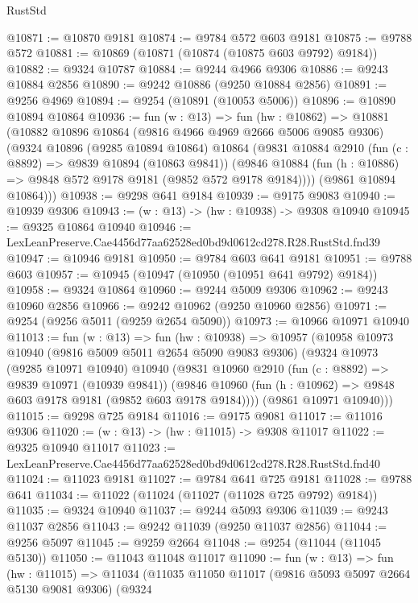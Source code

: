 \begin{lexlean}{RustStd}
\begin{coremodule}
@10871 := @10870 @9181
@10874 := @9784 @572 @603 @9181
@10875 := @9788 @572
@10881 := @10869 (@10871 (@10874 (@10875 @603 @9792) @9184))
@10882 := @9324 @10787
@10884 := @9244 @4966 @9306
@10886 := @9243 @10884 @2856
@10890 := @9242 @10886 (@9250 @10884 @2856)
@10891 := @9256 @4969
@10894 := @9254 (@10891 (@10053 @5006))
@10896 := @10890 @10894 @10864
@10936 := fun (w : @13) =>
  fun (hw : @10862) =>
  @10881
    (@10882
      @10896
      @10864
      (@9816 @4966 @4969 @2666 @5006 @9085 @9306)
      (@9324
        @10896
        (@9285 @10894 @10864)
        @10864
        (@9831
          @10884
          @2910
          (fun (c : @8892) => @9839 @10894 (@10863 @9841))
          (@9846 @10884 (fun (h : @10886) => @9848 @572 @9178 @9181 (@9852 @572 @9178 @9184))))
        (@9861 @10894 @10864)))
@10938 := @9298 @641 @9184
@10939 := @9175 @9083
@10940 := @10939 @9306
@10943 := (w : @13) -> (hw : @10938) -> @9308 @10940
@10945 := @9325 @10864 @10940
@10946 := LexLeanPreserve.Cae4456d77aa62528ed0bd9d0612cd278.R28.RustStd.fnd39
@10947 := @10946 @9181
@10950 := @9784 @603 @641 @9181
@10951 := @9788 @603
@10957 := @10945 (@10947 (@10950 (@10951 @641 @9792) @9184))
@10958 := @9324 @10864
@10960 := @9244 @5009 @9306
@10962 := @9243 @10960 @2856
@10966 := @9242 @10962 (@9250 @10960 @2856)
@10971 := @9254 (@9256 @5011 (@9259 @2654 @5090))
@10973 := @10966 @10971 @10940
@11013 := fun (w : @13) =>
  fun (hw : @10938) =>
  @10957
    (@10958
      @10973
      @10940
      (@9816 @5009 @5011 @2654 @5090 @9083 @9306)
      (@9324
        @10973
        (@9285 @10971 @10940)
        @10940
        (@9831
          @10960
          @2910
          (fun (c : @8892) => @9839 @10971 (@10939 @9841))
          (@9846 @10960 (fun (h : @10962) => @9848 @603 @9178 @9181 (@9852 @603 @9178 @9184))))
        (@9861 @10971 @10940)))
@11015 := @9298 @725 @9184
@11016 := @9175 @9081
@11017 := @11016 @9306
@11020 := (w : @13) -> (hw : @11015) -> @9308 @11017
@11022 := @9325 @10940 @11017
@11023 := LexLeanPreserve.Cae4456d77aa62528ed0bd9d0612cd278.R28.RustStd.fnd40
@11024 := @11023 @9181
@11027 := @9784 @641 @725 @9181
@11028 := @9788 @641
@11034 := @11022 (@11024 (@11027 (@11028 @725 @9792) @9184))
@11035 := @9324 @10940
@11037 := @9244 @5093 @9306
@11039 := @9243 @11037 @2856
@11043 := @9242 @11039 (@9250 @11037 @2856)
@11044 := @9256 @5097
@11045 := @9259 @2664
@11048 := @9254 (@11044 (@11045 @5130))
@11050 := @11043 @11048 @11017
@11090 := fun (w : @13) =>
  fun (hw : @11015) =>
  @11034
    (@11035
      @11050
      @11017
      (@9816 @5093 @5097 @2664 @5130 @9081 @9306)
      (@9324

\end{coremodule}
\end{lexlean}
